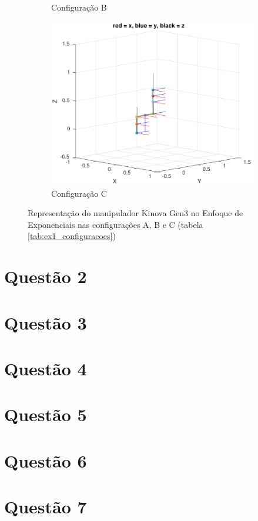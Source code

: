 \documentclass[a4paper,11pt]{article}
\theoremstyle{mytheor}
\begin{document}
\begin{figure}[!ht]
\begin{minipage}{\linewidth}
\begin{subfigure}[b]{0.45\textwidth}
    \caption{Configuração B}
    \end{subfigure}
  \end{minipage}
  \begin{minipage}{\linewidth}
  \centering
    \begin{subfigure}[b]{0.45\textwidth}
    \includegraphics[width=1\textwidth]{figs/ex1_c.pdf}
    \caption{Configuração C}
    \end{subfigure}
  \end{minipage}
\caption{Representação do manipulador Kinova Gen3 no Enfoque de Exponenciais nas configurações A, B e C (tabela \ref{tab:ex1_configuracoes})}
\label{fig:ex1_configuracoes}
\end{figure}



\section*{Questão 2}



\section*{Questão 3}

\section*{Questão 4}
\section*{Questão 5}
\section*{Questão 6}
\section*{Questão 7}
\end{document}
